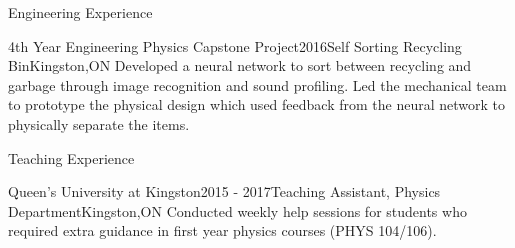 \documentclass{resume2} %
\begin{document}

\begin{rSection}{Engineering Experience}
	
	\begin{rSubsection}{4th Year Engineering Physics Capstone Project}{2016}{Self Sorting Recycling Bin}{Kingston,ON}
		 Developed a neural network to sort between recycling and garbage through image recognition and sound profiling.
		 Led the mechanical team to prototype the physical design which used feedback from the neural network to 
		 physically separate the items. 
	\end{rSubsection}
\iffalse
	\begin{rSubsection}{Engineering Physics Design Project}{2015}{Photodiode Research Sensor}{}
		 Designed and fabricated a research sensor used to assess the properties of photodiodes. Information gathered included efficiency, current and voltage under illuminated and darkened conditions using an Arduino, Matlab and LabVIEW
	\end{rSubsection}

	\begin{rSubsection}{Engineering Design and Practice II}{2014}{Nuclear Waste Gamma Radiation Detector}{Kingston,ON}
		 Prototyped a Nuclear Waste Gamma Radiation Detector. Through the process of material selection and decision making, the final product was designed for use in areas surrounding the Deep Geologic Repository in Ontario
	\end{rSubsection}

	\begin{rSubsection}{Wirecard AG}{Summer 2014}{Summer Technology Intern}{Singapore}
	 Redesigned Wirecard's payment processing webpage using HTML and CSS
	 It is currently used for redirecting online payments to Wirecard's payment processing service	
	\end{rSubsection}
\fi
\end{rSection}
\pagebreak

\begin{rSection}{Teaching Experience}
	
	\begin{rSubsection}{Queen's University at Kingston}{2015 - 2017}{Teaching Assistant, Physics Department}{Kingston,ON}
		 Conducted weekly help sessions for students who required extra guidance in first year physics courses (PHYS 104/106).
	\end{rSubsection}

\end{rSection}
\end{document}
